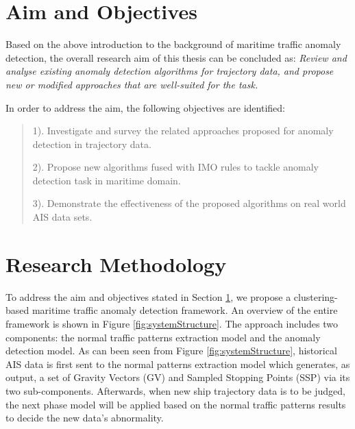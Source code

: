\documentclass[12pt,glossary]{dalcsthesis}
\begin{document}
\section{Aim and Objectives}
\label{sec:aim_and_objectives}

Based on the above introduction to the background of maritime traffic anomaly detection, the overall research aim of this thesis can be concluded as:  \emph{Review and analyse existing anomaly detection algorithms for trajectory data, and propose new or modified approaches that are well-suited for the task.}

In order to address the aim, the following objectives are identified:

\begin{quote}
1). Investigate and survey the related approaches proposed for anomaly detection in trajectory data.

2). Propose new algorithms fused with IMO rules to tackle anomaly detection task in maritime domain.

3). Demonstrate the effectiveness of the proposed algorithms on real world AIS data sets.

\end{quote}


\section{Research Methodology}
To address the aim and objectives stated in Section \ref{sec:aim_and_objectives}, we propose a clustering-based maritime traffic anomaly detection framework. An overview of the entire framework  is shown in Figure \ref{fig:systemStructure}.
The approach includes two components: the normal traffic patterns extraction model and the anomaly detection model. As can been seen from Figure \ref{fig:systemStructure}, historical AIS data is first sent to the normal patterns extraction model which generates, as output, a set of Gravity Vectors (GV) and Sampled Stopping Points (SSP) via its two sub-components. Afterwards, when new ship trajectory data is to be judged, the next phase model will be applied based on the normal traffic patterns results to decide the new data's abnormality. 
\end{document}
